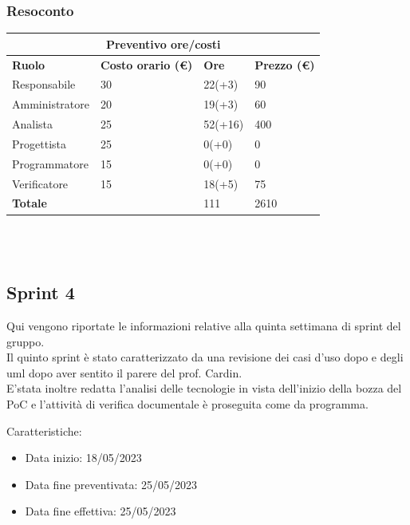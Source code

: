 \documentclass[10pt]{article}
\begin{document}
\subsubsection{Resoconto}
\begin{center}
	\begin{tabularx}{\textwidth}{|X|X|X|X|}
		\hline
		\multicolumn{4}{|c|}{\textbf{Preventivo ore/costi}}                                      \\
		\hline
		\hline
		\textbf{Ruolo}  & \textbf{Costo orario (\euro)} & \textbf{Ore} & \textbf{Prezzo (\euro)} \\
		\hline
		Responsabile    & 30                            & 22(+3)       & 90                      \\
		\hline
		Amministratore  & 20                            & 19(+3)       & 60                      \\
		\hline
		Analista        & 25                            & 52(+16)      & 400                     \\
		\hline
		Progettista     & 25                            & 0(+0)        & 0                       \\
		\hline
		Programmatore   & 15                            & 0(+0)        & 0                       \\
		\hline
		Verificatore    & 15                            & 18(+5)       & 75                      \\
		\hline
		\hline
		\textbf{Totale} &                               & 111          & 2610                    \\
		\hline
	\end{tabularx}\\[8pt]
	\mbox{}\\
\end{center}

\subsection{Sprint 4}
Qui vengono riportate le informazioni relative alla quinta settimana di sprint del gruppo. \\
Il quinto sprint è stato caratterizzato da una revisione dei casi d'uso dopo e degli uml dopo aver sentito il parere del prof. Cardin.\\
E'stata inoltre redatta l'analisi delle tecnologie in vista dell'inizio della bozza del PoC e l'attività di verifica documentale è proseguita come da programma.


Caratteristiche:
\begin{itemize}
	\item Data inizio: 18/05/2023
	\item Data fine preventivata: 25/05/2023
	\item Data fine effettiva: 25/05/2023
\end{itemize}
\end{document}
